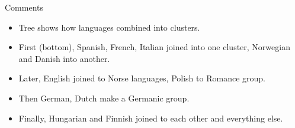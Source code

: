 \begin{frame}[fragile]{Comments}
  
  \begin{itemize}
  \item Tree shows how languages combined into clusters.
  \item First (bottom), Spanish, French, Italian joined into one
    cluster, Norwegian and Danish into another.
  \item Later, English joined to Norse languages, Polish to Romance group.
  \item Then German, Dutch make a Germanic group.
  \item Finally, Hungarian and Finnish joined to each other and
    everything else.
  \end{itemize}
  
\end{frame}

